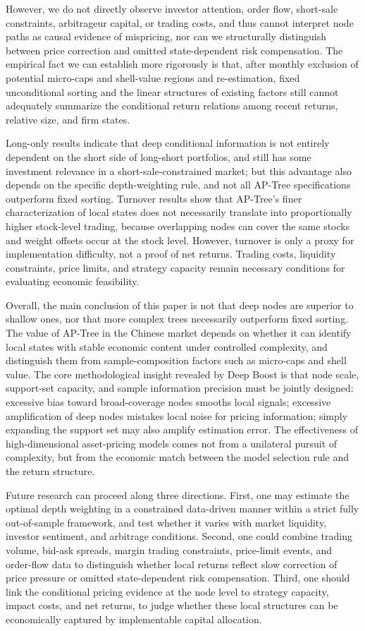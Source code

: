 \documentclass[12pt]{article}
\begin{document}
However, we do not directly observe investor attention, order flow, short-sale constraints, arbitrageur capital, or trading costs, and thus cannot interpret node paths as causal evidence of mispricing, nor can we structurally distinguish between price correction and omitted state-dependent risk compensation. The empirical fact we can establish more rigorously is that, after monthly exclusion of potential micro-caps and shell-value regions and re-estimation, fixed unconditional sorting and the linear structures of existing factors still cannot adequately summarize the conditional return relations among recent returns, relative size, and firm states.

Long-only results indicate that deep conditional information is not entirely dependent on the short side of long-short portfolios, and still has some investment relevance in a short-sale-constrained market; but this advantage also depends on the specific depth-weighting rule, and not all AP-Tree specifications outperform fixed sorting. Turnover results show that AP-Tree's finer characterization of local states does not necessarily translate into proportionally higher stock-level trading, because overlapping nodes can cover the same stocks and weight offsets occur at the stock level. However, turnover is only a proxy for implementation difficulty, not a proof of net returns. Trading costs, liquidity constraints, price limits, and strategy capacity remain necessary conditions for evaluating economic feasibility.

Overall, the main conclusion of this paper is not that deep nodes are superior to shallow ones, nor that more complex trees necessarily outperform fixed sorting. The value of AP-Tree in the Chinese market depends on whether it can identify local states with stable economic content under controlled complexity, and distinguish them from sample-composition factors such as micro-caps and shell value. The core methodological insight revealed by Deep Boost is that node scale, support-set capacity, and sample information precision must be jointly designed: excessive bias toward broad-coverage nodes smooths local signals; excessive amplification of deep nodes mistakes local noise for pricing information; simply expanding the support set may also amplify estimation error. The effectiveness of high-dimensional asset-pricing models comes not from a unilateral pursuit of complexity, but from the economic match between the model selection rule and the return structure.

Future research can proceed along three directions. First, one may estimate the optimal depth weighting in a constrained data-driven manner within a strict fully out-of-sample framework, and test whether it varies with market liquidity, investor sentiment, and arbitrage conditions. Second, one could combine trading volume, bid-ask spreads, margin trading constraints, price-limit events, and order-flow data to distinguish whether local returns reflect slow correction of price pressure or omitted state-dependent risk compensation. Third, one should link the conditional pricing evidence at the node level to strategy capacity, impact costs, and net returns, to judge whether these local structures can be economically captured by implementable capital allocation.
\end{document}
